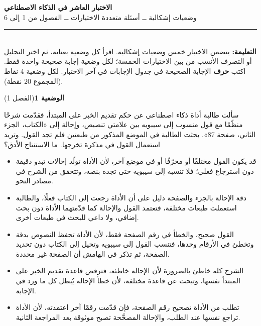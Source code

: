 \documentclass[11pt,a4paper]{article}
\begin{document}
\linespread{1.08}\selectfont
\begin{center}
{\LARGE\khatt\textbf{الاختبار العاشر في الذكاء الاصطناعي}}\\[4pt]
{\normalsize وضعيات إشكالية ــ أسئلة متعددة الاختيارات ــ الفصول من 1 إلى 6}
\end{center}
\vspace{-2pt}\rule{\textwidth}{0.6pt}\\[2pt]
\textbf{التعليمة:} يتضمن الاختبار خمس وضعيات إشكالية. اقرأ كل وضعية بعناية، ثم اختر التحليل أو التصرف الأنسب
من بين الاختيارات الخمسة؛ لكل وضعية إجابة صحيحة واحدة فقط.
اكتب \textbf{حرف} الإجابة الصحيحة في جدول الإجابات في آخر الاختبار.
لكل وضعية 4 نقاط (المجموع 20 نقطة).
\vspace{4pt}

\noindent
{\large\khatt\textbf{الوضعية 1}}\hfill{\small(الفصل 1)}\par\nopagebreak\vspace{3pt}
\setlength{\fboxsep}{7pt}\colorbox{gray!10}{\parbox{\dimexpr\linewidth-14pt}{سألت طالبة أداة ذكاء اصطناعي عن حكم تقديم الخبر على المبتدأ، فقدّمت شرحًا منظّمًا مع قول منسوب إلى سيبويه بين علامتي تنصيص، وإحالة إلى «الكتاب، الجزء الثاني، صفحة 87». بحثت الطالبة في الموضع المذكور من طبعتين فلم تجد القول. وتريد استعمال القول في مذكرة تخرجها. ما الاستنتاج الأدق؟}}\par\nopagebreak
\begin{itemize}[leftmargin=1.0cm, labelsep=6pt, itemsep=3pt, topsep=4pt, parsep=0pt]
  \item[\textbf{أ)}] قد يكون القول مختلقًا أو محرّفًا أو في موضع آخر، لأن الأداة تولّد إحالات تبدو دقيقة دون استرجاع فعلي؛ فلا تنسبه إلى سيبويه حتى تجده بنصه، وتتحقق من الشرح في مصادر النحو.
  \item[\textbf{ب)}] دقة الإحالة بالجزء والصفحة دليل على أن الأداة رجعت إلى الكتاب فعلًا، والطالبة استعملت طبعات مختلفة، فتعتمد القول والإحالة كما قدّمتهما الأداة دون بحث إضافي، ولا داعي للبحث في طبعات أخرى.
  \item[\textbf{ج)}] القول صحيح، والخطأ في رقم الصفحة فقط، لأن الأداة تحفظ النصوص بدقة وتخطئ في الأرقام وحدها، فتنسب القول إلى سيبويه وتحيل إلى الكتاب دون تحديد الصفحة، ثم تذكر في الهامش أن الصفحة غير محددة.
  \item[\textbf{د)}] الشرح كله خاطئ بالضرورة لأن الإحالة خاطئة، فترفض قاعدة تقديم الخبر على المبتدأ نفسها، وتبحث عن قاعدة مختلفة، لأن خطأ الإحالة يُبطل كل ما ورد في الإجابة.
  \item[\textbf{هـ)}] تطلب من الأداة تصحيح رقم الصفحة، فإن قدّمت رقمًا آخر اعتمدته، لأن الأداة تراجع نفسها عند الطلب، والإحالة المصحَّحة تصبح موثوقة بعد المراجعة الثانية.
\end{itemize}
\end{document}
